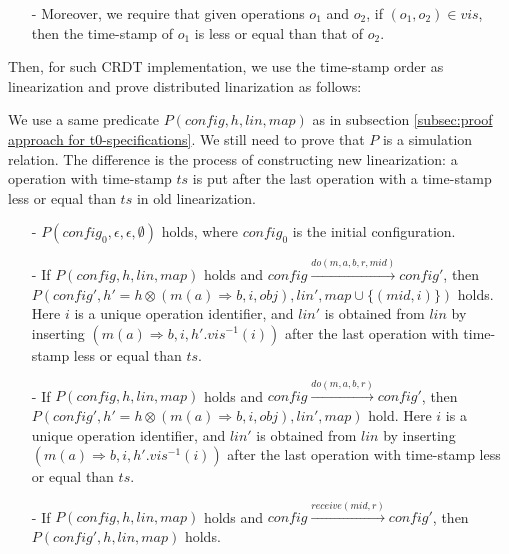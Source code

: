 {\begin{itemize}
\item[-] Moreover, we require that given operations $o_1$ and $o_2$, if $(o_1,o_2) \in \mathit{vis}$, then the time-stamp of $o_1$ is less or equal than that of $o_2$.
\end{itemize}

Then, for such CRDT implementation, we use the time-stamp order as linearization and prove distributed linarization as follows:

We use a same predicate $P(\mathit{config},h,\mathit{lin},\mathit{map})$ as in subsection \ref{subsec:proof approach for t0-specifications}. We still need to prove that $P$ is a simulation relation. The difference is the process of constructing new linearization: a operation with time-stamp $\mathit{ts}$ is put after the last operation with a time-stamp less or equal than $\mathit{ts}$ in old linearization.

\begin{itemize}
\setlength{\itemsep}{0.5pt}
\item[-] $P(\mathit{config}_0,\epsilon,\epsilon,\emptyset)$ holds, where $\mathit{config}_0$ is the initial configuration.

\item[-] If $P(\mathit{config},h,\mathit{lin},\mathit{map})$ holds and $\mathit{config} {\xrightarrow{\mathit{do}(m,a,b,r,\mathit{mid})}} \mathit{config}'$, then $P(\mathit{config}', h' = h \otimes (m(a) \Rightarrow b,i,\mathit{obj}),\mathit{lin}',\mathit{map} \cup \{ (\mathit{mid}, i) \})$ holds. Here $i$ is a unique operation identifier, and $\mathit{lin}'$ is obtained from $\mathit{lin}$ by inserting $(m(a) \Rightarrow b,i,h'.\mathit{vis}^{-1}(i))$ after the last operation with time-stamp less or equal than $\mathit{ts}$.

\item[-] If $P(\mathit{config},h,\mathit{lin},\mathit{map})$ holds and $\mathit{config} {\xrightarrow{\mathit{do}(m,a,b,r)}} \mathit{config}'$, then $P(\mathit{config}',h' = h \otimes (m(a) \Rightarrow b,i,\mathit{obj}),\mathit{lin}',\mathit{map})$ hold. Here $i$ is a unique operation identifier, and $\mathit{lin}'$ is obtained from $\mathit{lin}$ by inserting $(m(a) \Rightarrow b,i,h'.\mathit{vis}^{-1}(i))$ after the last operation with time-stamp less or equal than $\mathit{ts}$.

\item[-] If $P(\mathit{config},h,\mathit{lin},\mathit{map})$ holds and $\mathit{config} {\xrightarrow{\mathit{receive}(\mathit{mid},r)}} \mathit{config}'$, then $P(\mathit{config}',h,\mathit{lin},\mathit{map})$ holds.
\end{itemize}

}
